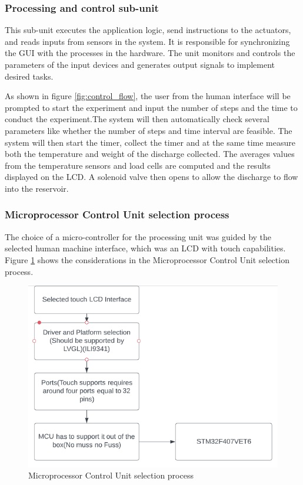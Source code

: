 \subsubsection{Processing and control sub-unit}
This sub-unit executes the application logic, send instructions to the actuators, and reads inputs from sensors in the system. It is responsible for synchronizing the GUI with the processes in the hardware. The unit monitors and controls the parameters of the input devices and generates output signals to implement desired tasks.
\par
As shown in figure \ref{fig:control_flow}, the user from the human interface will be prompted to start the experiment and input the number of steps and the time to conduct the experiment.The system will then automatically check several parameters like whether the number of steps and time interval are feasible. The system will then start the timer, collect the timer and at the same time measure both the temperature and weight of the discharge collected. The averages values from the temperature sensors and load cells are computed and the results displayed on the LCD. A solenoid valve then opens to allow the discharge to flow into the reservoir.

\subsubsection{Microprocessor Control Unit selection process}
The choice of a micro-controller for the processing unit was guided by the selected human machine interface, which was an LCD with touch capabilities. Figure \ref{fig:mcu selection} shows the considerations in the Microprocessor Control Unit selection process.
\begin{figure}[H]
    \centering
    \includegraphics[width=0.9\linewidth]{Figures/mcu selection.png}
    \caption{Microprocessor Control Unit selection process}
    \label{fig:mcu selection}
\end{figure}


